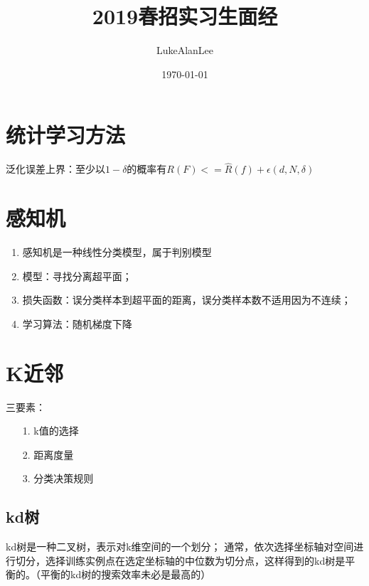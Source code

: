 \documentclass[UTF8]{article}%
\title{\heiti 2019春招实习生面经}
\author{\kaishu LukeAlanLee}
\date{\today}
\begin{document}
	\maketitle %
	\tableofcontents
	 \newpage
	\section{统计学习方法}
	泛化误差上界：至少以$1-\delta$的概率有$R(F)<=\hat{R}(f)+\epsilon(d,N,\delta)$
	\newpage
	\section{感知机}
	\begin{enumerate}
		\item 感知机是一种线性分类模型，属于判别模型
		\item 模型：寻找分离超平面；
		\item 损失函数：误分类样本到超平面的距离，误分类样本数不适用因为不连续；
		\item 学习算法：随机梯度下降
	\end{enumerate}
	\newpage
	\section{K近邻}
	三要素：
	\begin{enumerate}		
		\item[1.]k值的选择
		\item[2.] 距离度量
		\item[3.] 分类决策规则
	\end{enumerate}
	\subsection{kd树}
	kd树是一种二叉树，表示对k维空间的一个划分；
	通常，依次选择坐标轴对空间进行切分，选择训练实例点在选定坐标轴的中位数为切分点，这样得到的kd树是平衡的。（平衡的kd树的搜索效率未必是最高的）
	
	\newpage    
\end{document}
